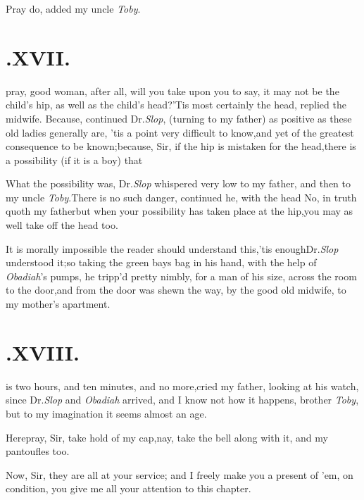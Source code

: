 \documentclass{article}
\begin{document}
Pray do, added my uncle \textit{Toby}.

\section{.\quad  XVII.}

 pray, good woman, after all, will
you take upon you to say, it may not be the child’s hip, as well
as the child’s head?\tsh ’Tis most certainly the head, replied
the midwife. Because, continued Dr.\@ \textit{Slop}, (turning to
my father) as positive as these old ladies generally are,\tsh
’tis a point very difficult to know,\tsk and yet of the greatest
consequence to be known;\tsh because, Sir, if the hip is
mistaken for the head,\tsk there is a possibility (if it is a
boy) that\break 
{}

\tsh What the possibility was, Dr.\@ \textit{Slop}
whispered very low to my father, and then to my uncle
\textit{Toby}.\tsh There is no
such danger, continued he, with the head\break
\tsk No, in truth quoth my father\tsk but when
your possibility has taken place at the hip,\tsk you may as well
take off the head too.

\tsh It is morally impossible the reader should understand this,\tsh ’tis
enough\break Dr.\@ \textit{Slop} understood it;\tsh so taking the
green bays bag in his hand, with the help of
\textit{Obadiah}’s pumps, he tripp’d pretty nimbly, for a
man of his size, across the room to the door,\tsh and from
the door was shewn the way, by the good old midwife, to my
mother’s apartment.

\section{.\quad  XVIII.}

 is two hours, and ten minutes,\tsk\break
and no more,\tsh cried my father, looking at his
watch, since Dr.\@ \textit{Slop} and
\textit{Obadiah} arrived, \tsh and I know not how it happens,
brother \textit{Toby}, \tsh\break but to my imagination it seems
almost an age.

\tsh Here\tsh pray, Sir, take hold of my cap,\tsk nay, take the bell along with it, and my
pantoufles too.\tsh

Now, Sir, they are all at your service; and I freely make you a
present of ’em, on condition, you give me all your attention
to this chapter.
\end{document}
